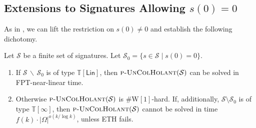 \documentclass[authorcolumns,numberwithinsect]{no-lipics-v2022}
\begin{document}
\subsection{Extensions to Signatures Allowing $s(0) = 0$}
As in , we can lift the restriction on $s(0) \neq 0$ and establish the following dichotomy.

\begin{theorem}
Let $\mathcal{S}$ be a finite set of signatures. Let $\mathcal{S}_0 = \{s \in \mathcal{S} \mid s(0) = 0\}$. 
\begin{enumerate}
\item If $\mathcal{S}\,\backslash\, \mathcal{S}_0$ is of type $\mathbb{T}[\mathsf{Lin}]$, then $\text{\sc{p-UnColHolant}}(\mathcal{S})$ can be solved in FPT-near-linear time.
\item Otherwise $\text{\sc{p-UnColHolant}}(\mathcal{S})$ is $\#\mathrm{W}[1]$-hard. If, additionally, $\mathcal{S}\setminus \mathcal{S}_0$ is of type $\mathbb{T}[\infty]$, then $\text{\sc{p-UnColHolant}}(\mathcal{S})$ cannot be solved in time $f(k)\cdot |\Omega|^{o(k/\log k)}$, unless ETH fails.
\end{enumerate}
\end{theorem}
\end{document}
